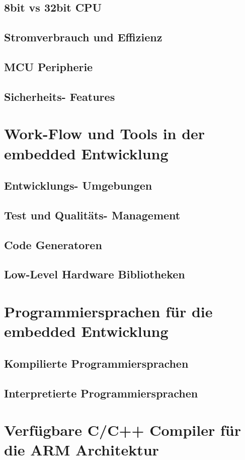 \documentclass[MES,Master,ngerman]{twbook}%
\begin{document}
\subsection{8bit vs 32bit CPU}
\subsection{Stromverbrauch und Effizienz}
\subsection{MCU Peripherie}
\subsection{Sicherheits- Features}
\section{Work-Flow und Tools in der embedded Entwicklung}
\subsection{Entwicklungs- Umgebungen}
\subsection{Test und Qualitäts- Management}
\subsection{Code Generatoren}
\subsection{Low-Level Hardware Bibliotheken}
\section{Programmiersprachen für die embedded Entwicklung}
\subsection{Kompilierte Programmiersprachen}
\subsection{Interpretierte Programmiersprachen}
\section{Verfügbare C/C++ Compiler für die ARM Architektur}
\end{document}
